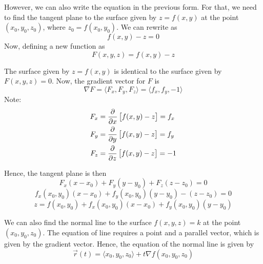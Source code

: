 However, we can also write the equation in the previous form. For that, we need to find the tangent plane to the surface given by $z=f(x,y)$ at the point $(x_0,y_0,z_0)$, where $z_0=f(x_0,y_0)$. We can rewrite as \[ 
    f(x,y) - z = 0
\]
Now, defining a new function as \[ 
    F(x,y,z) = f(x,y) - z
\]

The surface given by $z=f(x,y)$ is identical to the surface given by $F(x,y,z)=0$. Now, the gradient vector for $F$ is \[ 
    \nabla F = \langle F_x, F_y, F_z \rangle = \langle f_x, f_y, -1 \rangle
\]
Note:
\begin{align*}
    F_x &= \pdv{}{x} \left[ f(x,y) - z \right] = f_x \\
    F_y &= \pdv{}{y} \left[ f(x,y) - z \right] = f_y \\
    F_z &= \pdv{}{z} \left[ f(x,y) - z \right] = -1
\end{align*}

Hence, the tangent plane is then
    \[ F_x (x-x_0) + F_y (y-y_0) + F_z (z-z_0) = 0 \]
    \[ f_x(x_0,y_0)(x-x_0) + f_y(x_0,y_0)(y-y_0) - (z-z_0) = 0 \]
    \[ \boxed{ z = f(x_0,y_0) + f_x(x_0,y_0)(x-x_0) + f_y(x_0,y_0)(y-y_0) } \]

We can also find the normal line to the surface $f(x,y,z)=k$ at the point $(x_0,y_0,z_0)$. The equation of line requires a point and a parallel vector, which is given by the gradient vector. Hence, the equation of the normal line is given by
\[ 
    \boxed{ \vec{r}(t) = \langle x_0,y_0,z_0 \rangle + t \nabla f(x_0,y_0,z_0) }
\]



